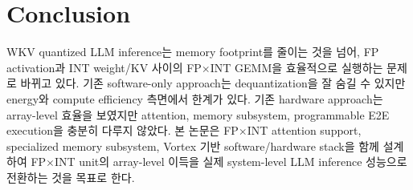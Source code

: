 \documentclass[11pt]{article}
\newcommand{\fpint}{FP$\times$INT}
\newcommand{\wkv}{WKV}
\begin{document}
\section{Conclusion}

\wkv{} quantized LLM inference는 memory footprint를 줄이는 것을 넘어, FP activation과 INT weight/KV 사이의 \fpint{} GEMM을 효율적으로 실행하는 문제로 바뀌고 있다.
기존 software-only approach는 dequantization을 잘 숨길 수 있지만 energy와 compute efficiency 측면에서 한계가 있다.
기존 hardware approach는 array-level 효율을 보였지만 attention, memory subsystem, programmable E2E execution을 충분히 다루지 않았다.
본 논문은 \fpint{} attention support, specialized memory subsystem, Vortex 기반 software/hardware stack을 함께 설계하여 \fpint{} unit의 array-level 이득을 실제 system-level LLM inference 성능으로 전환하는 것을 목표로 한다.




\end{document}
